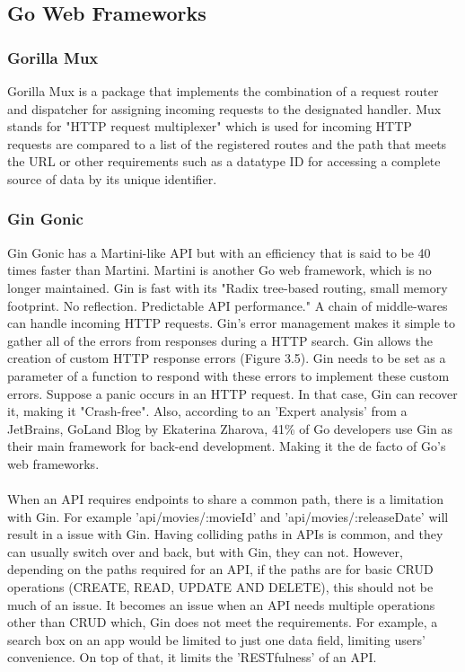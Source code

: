 \subsection{Go Web Frameworks}
\subsubsection{Gorilla Mux}
Gorilla Mux is a package that implements the combination of a request router and dispatcher for assigning incoming requests to the designated handler. Mux stands for "HTTP request multiplexer" which is used for incoming HTTP requests are compared to a list of the registered routes and the path that meets the URL or other requirements such as a datatype ID for accessing a complete source of data by its unique identifier. \cite{ref11}

\subsubsection{Gin Gonic}
Gin Gonic has a Martini-like API but with an efficiency that is said to be 40 times faster than Martini. Martini is another Go web framework, which is no longer maintained. Gin is fast with its "Radix tree-based routing, small memory footprint. No reflection. Predictable API performance." \cite{ref12} A chain of middle-wares can handle incoming HTTP requests. Gin's error management makes it simple to gather all of the errors from responses during a HTTP search. Gin allows the creation of custom HTTP response errors (Figure 3.5). Gin needs to be set as a parameter of a function to respond with these errors to implement these custom errors. Suppose a panic occurs in an HTTP request. In that case, Gin can recover it, making it "Crash-free". \cite{ref12} Also, according to an 'Expert analysis' from a JetBrains, GoLand Blog by Ekaterina Zharova, 41\% of Go developers use Gin as their main framework for back-end development. \cite{ref13} Making it the de facto of Go's web frameworks.
\\\\ When an API requires endpoints to share a common path, there is a limitation with Gin. For example 'api/movies/:movieId' and 'api/movies/:releaseDate' will result in a issue with Gin. Having colliding paths in APIs is common, and they can usually switch over and back, but with Gin, they can not. However, depending on the paths required for an API, if the paths are for basic CRUD operations (CREATE, READ, UPDATE AND DELETE), this should not be much of an issue. It becomes an issue when an API needs multiple operations other than CRUD which, Gin does not meet the requirements. For example, a search box on an app would be limited to just one data field, limiting users' convenience. On top of that, it limits the 'RESTfulness' of an API.

